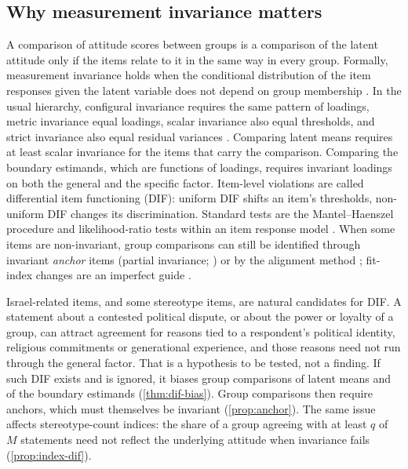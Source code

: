 \subsection{Why measurement invariance matters}\label{sec:bg-invariance}

A comparison of attitude scores between groups is a comparison of the latent attitude only if the items relate to it in the same way in every group. Formally, measurement invariance holds when the conditional distribution of the item responses given the latent variable does not depend on group membership \citep{meredith1993,millsap2011}. In the usual hierarchy, configural invariance requires the same pattern of loadings, metric invariance equal loadings, scalar invariance also equal thresholds, and strict invariance also equal residual variances \citep{meredith1993,steenkamp1998,davidov2014}. Comparing latent means requires at least scalar invariance for the items that carry the comparison. Comparing the boundary estimands, which are functions of loadings, requires invariant loadings on both the general and the specific factor. Item-level violations are called differential item functioning (DIF): uniform DIF shifts an item's thresholds, non-uniform DIF changes its discrimination. Standard tests are the Mantel--Haenszel procedure \citep{holland1988} and likelihood-ratio tests within an item response model \citep{thissen1993}. When some items are non-invariant, group comparisons can still be identified through invariant \emph{anchor} items (partial invariance; \citealp{byrne1989}) or by the alignment method \citep{asparouhov2014}; fit-index changes are an imperfect guide \citep{chen2007}.

Israel-related items, and some stereotype items, are natural candidates for DIF. A statement about a contested political dispute, or about the power or loyalty of a group, can attract agreement for reasons tied to a respondent's political identity, religious commitments or generational experience, and those reasons need not run through the general factor. That is a hypothesis to be tested, not a finding. If such DIF exists and is ignored, it biases group comparisons of latent means and of the boundary estimands (\cref{thm:dif-bias}). Group comparisons then require anchors, which must themselves be invariant (\cref{prop:anchor}). The same issue affects stereotype-count indices: the share of a group agreeing with at least $q$ of $M$ statements need not reflect the underlying attitude when invariance fails (\cref{prop:index-dif}).

